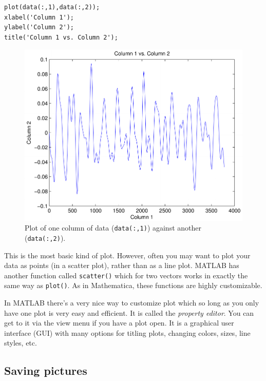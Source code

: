 \begin{framed}
\begin{verbatim}
plot(data(:,1),data(:,2));
xlabel('Column 1');
ylabel('Column 2');
title('Column 1 vs. Column 2');
\end{verbatim}
\end{framed}
\begin{figure}[h]
\centering
\includegraphics[scale=1]{p1e1.pdf}
\caption{Plot of one column of data (\texttt{data(:,1)}) against another (\texttt{data(:,2)}).}
\label{dataplot}
\end{figure}
This is the most basic kind of plot. However, often you may want to plot your data as points (in a scatter plot), rather than as a line plot. MATLAB has another function called \texttt{scatter()} which for two vectors works in exactly the same way as \texttt{plot()}. As in Mathematica, these functions are highly customizable.
\begin{remark}
In MATLAB there's a very nice way to customize plot which so long as you only have one plot is very easy and efficient. It is called the \emph{property editor}. You can get to it via the view menu if you have a plot open. It is a graphical user interface (GUI) with many options for titling plots, changing colors, sizes, line styles, etc.
\end{remark}

\subsection{Saving pictures}


